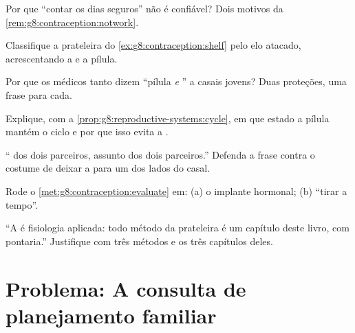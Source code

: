\begin{exercise}[$\star$]\label{exo:g8:contraception:6}
Por que ``contar os dias seguros'' não é confiável? Dois motivos da
\cref{rem:g8:contraception:notwork}.
\end{exercise}

\begin{exercise}[$\star\star$]\label{exo:g8:contraception:7}
Classifique a prateleira do \cref{ex:g8:contraception:shelf} pelo elo
atacado, acrescentando a  e a pílula.
\end{exercise}

\begin{exercise}[$\star\star$]\label{exo:g8:contraception:8}
Por que os médicos tanto dizem ``pílula \emph{e} '' a casais
jovens? Duas proteções, uma frase para cada.
\end{exercise}

\begin{exercise}[$\star\star$]\label{exo:g8:contraception:9}
Explique, com a \cref{prop:g8:reproductive-systems:cycle}, em que
estado a pílula mantém o ciclo e por que isso evita a .
\end{exercise}

\begin{exercise}[$\star\star$]\label{exo:g8:contraception:10}
`` dos dois parceiros, assunto dos dois parceiros.'' Defenda a
frase contra o costume de deixar a  para um dos lados do
casal.
\end{exercise}

\begin{exercise}[$\star\star$]\label{exo:g8:contraception:11}
Rode o \cref{met:g8:contraception:evaluate} em: (a) o implante
hormonal; (b) ``tirar a tempo''.
\end{exercise}

\begin{exercise}[$\star\star\star$]\label{exo:g8:contraception:12}
``A  é fisiologia aplicada: todo método da prateleira é um
capítulo deste livro, com pontaria.'' Justifique com três métodos e os
três capítulos deles.
\end{exercise}

\section{Problema: A consulta de planejamento familiar}

